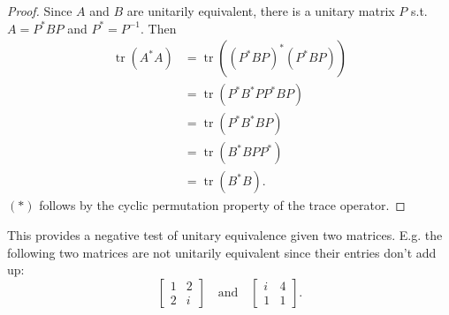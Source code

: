 \documentclass[20pt]{extarticle}
\theoremstyle{plain}
\theoremstyle{definition}
\theoremstyle{remark}
\DeclareMathOperator{\tr}{tr}
\newcommand{\0}{\varnothing}
\newcommand{\<}{\langle}
\renewcommand{\>}{\rangle}
\begin{document}
\begin{proof}
Since $ A $ and $ B $ are unitarily equivalent, there is a unitary matrix $ P $ s.t. $ A = P^* B P $ and $ P^* = P^{-1}. $ Then \begin{align*}
\tr(A^* A) &= \tr((P^* B P)^* (P^* B P)) \\
&= \tr(P^* B^* P P^* B P) \\
&= \tr(P^* B^* B P) \\
&= \tr(B^* B P P^*) \tag{$ * $} \\
&= \tr(B^* B).
\end{align*}
$ (*) $ follows by the cyclic permutation property of the trace operator.
\end{proof}

This provides a negative test of unitary equivalence given two matrices. E.g. the following two matrices are not unitarily equivalent since their entries don't add up: \[
\left[ \begin{array}{cc}
1 & 2 \\
2 & i
\end{array} \right]
\quad\text{and}\quad
\left[ \begin{array}{cc}
i & 4 \\
1 & 1
\end{array} \right].
\]
\end{document}
